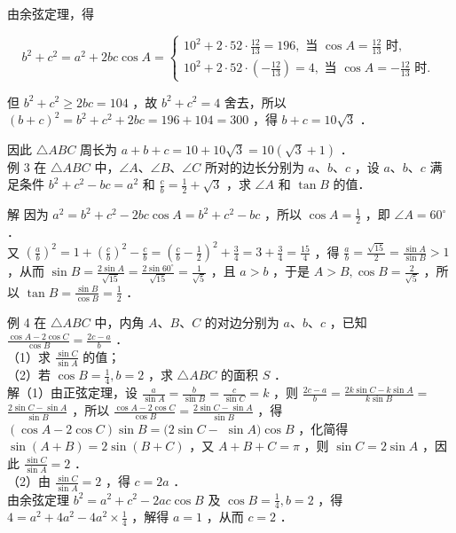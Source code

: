 \documentclass[10pt]{article}
\begin{document}
由余弦定理，得

\[
b^{2}+c^{2}=a^{2}+2 b c \cos A=\left\{\begin{array}{l}
10^{2}+2 \cdot 52 \cdot \frac{12}{13}=196, \text { 当 } \cos A=\frac{12}{13} \text { 时, } \\
10^{2}+2 \cdot 52 \cdot\left(-\frac{12}{13}\right)=4, \text { 当 } \cos A=-\frac{12}{13} \text { 时. }
\end{array}\right.
\]

但 \(b^{2}+c^{2} \geqslant 2 b c=104\) ，故 \(b^{2}+c^{2}=4\) 舍去，所以 \((b+c)^{2}=b^{2}+c^{2}+2 b c=196+104=300\) ，得 \(b+c=10 \sqrt{3}\) ．

因此 \(\triangle A B C\) 周长为 \(a+b+c=10+10 \sqrt{3}=10(\sqrt{3}+1)\) ．\\
例 3 在 \(\triangle A B C\) 中，\(\angle A 、 \angle B 、 \angle C\) 所对的边长分别为 \(a 、 b 、 c\) ，设 \(a 、 b 、 c\) 满足条件 \(b^{2}+c^{2}-b c=a^{2}\) 和 \(\frac{c}{b}=\frac{1}{2}+\sqrt{3}\) ，求 \(\angle A\) 和 \(\tan B\) 的值．

解 因为 \(a^{2}=b^{2}+c^{2}-2 b c \cos A=b^{2}+c^{2}-b c\) ，所以 \(\cos A=\frac{1}{2}\) ，即 \(\angle A=60^{\circ}\) ．\\
又 \(\left(\frac{a}{b}\right)^{2}=1+\left(\frac{c}{b}\right)^{2}-\frac{c}{b}=\left(\frac{c}{b}-\frac{1}{2}\right)^{2}+\frac{3}{4}=3+\frac{3}{4}=\frac{15}{4}\) ，得 \(\frac{a}{b}=\frac{\sqrt{15}}{2}=\frac{\sin A}{\sin B}>1\) ，从而 \(\sin B=\frac{2 \sin A}{\sqrt{15}}=\frac{2 \sin 60^{\circ}}{\sqrt{15}}=\frac{1}{\sqrt{5}}\) ，且 \(a>b\) ，于是 \(A>B, \cos B=\frac{2}{\sqrt{5}}\) ，所以 \(\tan B=\frac{\sin B}{\cos B}=\frac{1}{2}\) ．

例 4 在 \(\triangle A B C\) 中，内角 \(A 、 B 、 C\) 的对边分别为 \(a 、 b 、 c\) ，已知 \(\frac{\cos A-2 \cos C}{\cos B}=\frac{2 c-a}{b}\) ．\\
（1）求 \(\frac{\sin C}{\sin A}\) 的值；\\
（2）若 \(\cos B=\frac{1}{4}, b=2\) ，求 \(\triangle A B C\) 的面积 \(S\) ．\\
解（1）由正弦定理，设 \(\frac{a}{\sin A}=\frac{b}{\sin B}=\frac{c}{\sin C}=k\) ，则 \(\frac{2 c-a}{b}=\frac{2 k \sin C-k \sin A}{k \sin B}=\) \(\frac{2 \sin C-\sin A}{\sin B}\) ，所以 \(\frac{\cos A-2 \cos C}{\cos B}=\frac{2 \sin C-\sin A}{\sin B}\) ，得 \((\cos A-2 \cos C) \sin B=(2 \sin C-\) \(\sin A) \cos B\) ，化简得 \(\sin (A+B)=2 \sin (B+C)\) ，又 \(A+B+C=\pi\) ，则 \(\sin C=2 \sin A\) ，因此 \(\frac{\sin C}{\sin A}=2\) ．\\
（2）由 \(\frac{\sin C}{\sin A}=2\) ，得 \(c=2 a\) ．\\
由余弦定理 \(b^{2}=a^{2}+c^{2}-2 a c \cos B\) 及 \(\cos B=\frac{1}{4}, b=2\) ，得 \(4=a^{2}+4 a^{2}-4 a^{2} \times \frac{1}{4}\) ，解得 \(a=1\) ，从而 \(c=2\) ．
\end{document}
